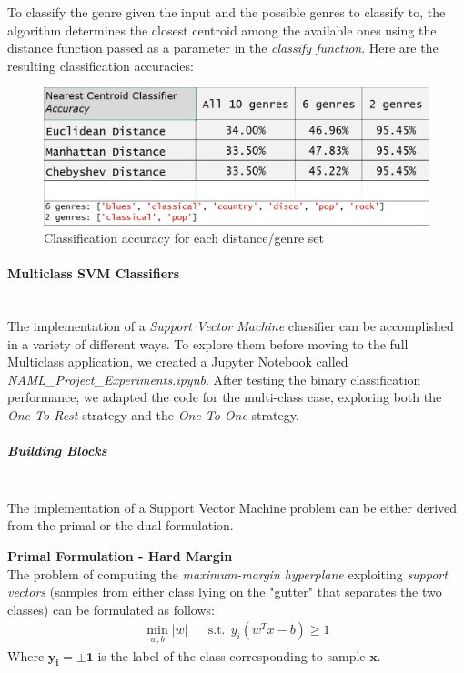 \documentclass[12pt]{article}
\begin{document}
	To classify the genre given the input and the possible genres to classify to, the algorithm determines the closest centroid among the available ones using the distance function passed as a parameter in the \textit{classify function}. Here are the resulting classification accuracies:
	\begin{figure}[H]
		\hspace{70pt}\includegraphics[scale=0.5]{nc_acc}
		\caption{Classification accuracy for each distance/genre set}
	\end{figure}
	
	\paragraph{Multiclass SVM Classifiers}\mbox{}\\\newline
	The implementation of a \textit{Support Vector Machine} classifier can be accomplished in a variety of different ways. To explore them before moving to the full Multiclass application, we created a Jupyter Notebook called \textit{NAML\_Project\_Experiments.ipynb}. After testing the binary classification performance, we adapted the code for the multi-class case, exploring both the \textit{One-To-Rest} strategy and the \textit{One-To-One} strategy.
	\subparagraph{Building Blocks}\mbox{}\\\newline
	The implementation of a Support Vector Machine problem can be either derived from the primal or the dual formulation.
	
	\textbf{Primal Formulation - Hard Margin}\\
	The problem of computing the \textit{maximum-margin hyperplane} exploiting \textit{support vectors} (samples from either class lying on the "gutter" that separates the two classes) can be formulated as follows:\\
	\begin{align}
		\min_{w,b} |w| &&
		\text{s.t.}\ \ y_i(w^Tx-b)\ge 1
	\end{align} 
	Where $\mathbf{y_i =\pm 1}$ is the label of the class corresponding to sample $\mathbf{x}$.\\
	
\end{document}
